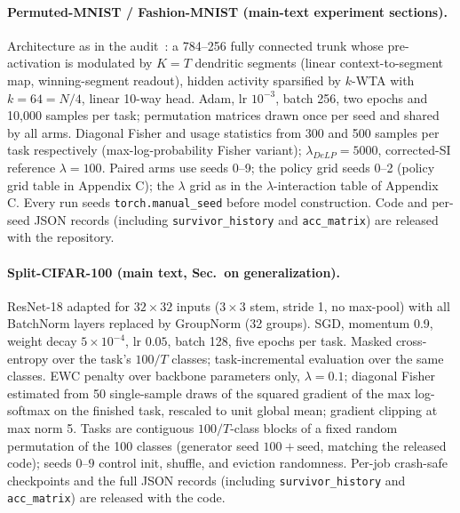\documentclass[11pt]{article}
\newcommand{\delp}{DeLP}
\begin{document}
\paragraph{Permuted-MNIST / Fashion-MNIST (main-text experiment
sections).}
Architecture as in the audit~\cite{zhou2026delp}: a 784--256 fully
connected trunk whose pre-activation is modulated by $K{=}T$ dendritic
segments (linear context-to-segment map, winning-segment readout),
hidden activity sparsified by $k$-WTA with $k{=}64 = N/4$, linear
10-way head. Adam, lr $10^{-3}$, batch 256, two epochs and 10{,}000
samples per task; permutation matrices drawn once per seed and shared
by all arms. Diagonal Fisher and usage statistics from 300 and 500
samples per task respectively (max-log-probability Fisher variant);
$\lambda_{\delp}{=}5000$, corrected-SI reference $\lambda{=}100$.
Paired arms use seeds 0--9; the policy grid seeds 0--2 (policy grid
table in Appendix C); the $\lambda$ grid as in the $\lambda$-interaction
table of Appendix C. Every run seeds
\texttt{torch.manual\_seed} before model construction. Code and
per-seed JSON records (including \texttt{survivor\_history} and
\texttt{acc\_matrix}) are released with the repository.

\begin{sloppypar}
\paragraph{Split-CIFAR-100 (main text, Sec.~on generalization).}
ResNet-18 adapted for $32{\times}32$ inputs ($3{\times}3$ stem,
stride 1, no max-pool) with all BatchNorm layers replaced by GroupNorm
(32 groups). SGD, momentum 0.9, weight decay $5{\times}10^{-4}$, lr
$0.05$, batch 128, five epochs per task. Masked cross-entropy over the
task's $100/T$ classes; task-incremental evaluation over the same classes.
EWC penalty over backbone parameters only, $\lambda{=}0.1$; diagonal
Fisher estimated from 50 single-sample draws of the squared gradient
of the max log-softmax on the finished task, rescaled to unit global
mean; gradient clipping at max norm 5. Tasks are contiguous
$100/T$-class blocks of a fixed random permutation of the 100 classes
(generator seed $100{+}\mathrm{seed}$, matching the released code);
seeds $0$--$9$ control init,
shuffle, and eviction randomness. Per-job crash-safe checkpoints and
the full JSON records (including \texttt{survivor\_history} and
\texttt{acc\_matrix}) are released with the code.
\end{sloppypar}

\end{document}
